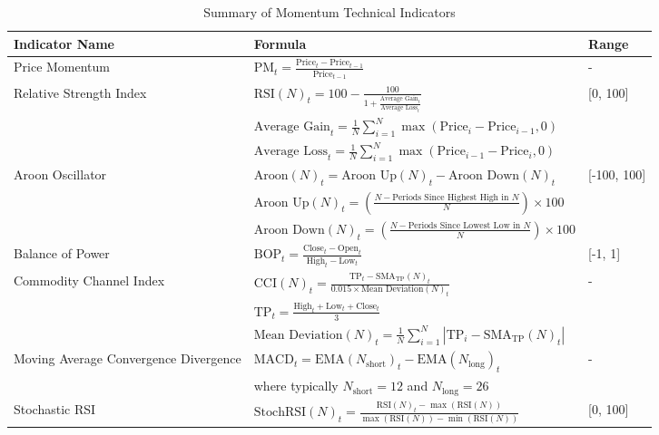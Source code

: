 \begin{table}[htb!]
\caption{Summary of Momentum Technical Indicators}
\label{Table:MomentumIndicators}
\centering
\footnotesize
\begin{tabularx}{\textwidth}{@{}lXl@{}}
\toprule
\textbf{Indicator Name} & \textbf{Formula} & \textbf{Range} \\ 
\midrule
Price Momentum & $\text{PM}_t = \frac{\text{Price}_t - \text{Price}_{t-1}}{\text{Price}_{t-1}}$ & - \\
\addlinespace
Relative Strength Index & $\text{RSI}(N)_t = 100 - \frac{100}{1 + \frac{\text{Average Gain}_t}{\text{Average Loss}_t}}$ & [0, 100] \\
\addlinespace
& $\text{Average Gain}_t = \frac{1}{N}\sum_{i=1}^{N} \max(\text{Price}_i - \text{Price}_{i-1}, 0)$ & \\
\addlinespace
& $\text{Average Loss}_t = \frac{1}{N}\sum_{i=1}^{N} \max(\text{Price}_{i-1} - \text{Price}_i, 0)$ & \\
\addlinespace
Aroon Oscillator & $\text{Aroon}(N)_t = \text{Aroon Up}(N)_t - \text{Aroon Down}(N)_t$ & [-100, 100] \\
\addlinespace
& $\text{Aroon Up}(N)_t = \left( \frac{N - \text{Periods Since Highest High in } N}{N} \right) \times 100$ & \\
\addlinespace
& $\text{Aroon Down}(N)_t = \left( \frac{N - \text{Periods Since Lowest Low in } N}{N} \right) \times 100$ & \\
\addlinespace
Balance of Power & $\text{BOP}_t = \frac{\text{Close}_t - \text{Open}_t}{\text{High}_t - \text{Low}_t}$ & [-1, 1] \\
\addlinespace
Commodity Channel Index & $\text{CCI}(N)_t = \frac{\text{TP}_t - \text{SMA}_\text{TP}(N)_t}{0.015 \times \text{Mean Deviation}(N)_t}$ & - \\
\addlinespace
& $\text{TP}_t = \frac{\text{High}_t + \text{Low}_t + \text{Close}_t}{3}$ & \\
\addlinespace
& $\text{Mean Deviation}(N)_t = \frac{1}{N}\sum_{i=1}^{N} |\text{TP}_i - \text{SMA}_\text{TP}(N)_t|$ & \\
\addlinespace
Moving Average Convergence Divergence & $\text{MACD}_t = \text{EMA}(N_{\text{short}})_t - \text{EMA}(N_{\text{long}})_t $ & - \\
\addlinespace
& where typically $N_{\text{short}} = 12$ and $N_{\text{long}} = 26$ & \\
\addlinespace
Stochastic RSI & $\text{StochRSI}(N)_t = \frac{\text{RSI}(N)_t - \max(\text{RSI}(N))}{\max(\text{RSI}(N)) - \min(\text{RSI}(N))}$ & [0, 100] \\

\end{tabularx}
\end{table}
